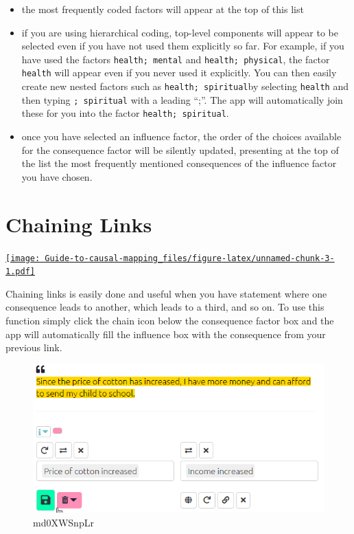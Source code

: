 \documentclass[
]{book}
\providecommand{\tightlist}{%
  \setlength{\itemsep}{0pt}\setlength{\parskip}{0pt}}
\begin{document}
\begin{itemize}
\tightlist
\item
  the most frequently coded factors will appear at the top of this list
\item
  if you are using hierarchical coding, top-level components will appear to be selected even if you have not used them explicitly so far. For example, if you have used the factors \texttt{health;\ mental} and \texttt{health;\ physical}, the factor \texttt{health} will appear even if you never used it explicitly. You can then easily create new nested factors such as \texttt{health;\ spiritual}by selecting \texttt{health} and then typing \texttt{;\ spiritual} with a leading ``;''. The app will automatically join these for you into the factor \texttt{health;\ spiritual}.
\item
  once you have selected an influence factor, the order of the choices available for the consequence factor will be silently updated, presenting at the top of the list the most frequently mentioned consequences of the influence factor you have chosen.
\end{itemize}

\hypertarget{xchaining-links}{%
\section{Chaining Links}\label{xchaining-links}}

\href{https://player.vimeo.com/video/588881701}{\texttt{[image: Guide-to-causal-mapping\_files/figure-latex/unnamed-chunk-3-1.pdf]}}

Chaining links is easily done and useful when you have statement where one consequence leads to another, which leads to a third, and so on. To use this function simply click the chain icon below the consequence factor box and the app will automatically fill the influence box with the consequence from your previous link.

\begin{figure}
\centering
\includegraphics[width=6.77083in,height=\textheight]{_assets/md0XWSnpLr.gif}
\caption{md0XWSnpLr}
\end{figure}
\end{document}
